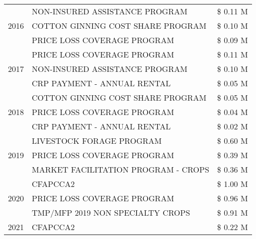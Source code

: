 \begin{tabular}{llr}
\multirow[t]{3}{*}{2016} & NON-INSURED ASSISTANCE PROGRAM & \$ 0.11 M \\
 & COTTON GINNING COST SHARE PROGRAM & \$ 0.10 M \\
 & PRICE LOSS COVERAGE PROGRAM & \$ 0.09 M \\
\cline{1-3}
\multirow[t]{3}{*}{2017} & PRICE LOSS COVERAGE PROGRAM & \$ 0.11 M \\
 & NON-INSURED ASSISTANCE PROGRAM & \$ 0.10 M \\
 & CRP PAYMENT - ANNUAL RENTAL & \$ 0.05 M \\
\cline{1-3}
\multirow[t]{3}{*}{2018} & COTTON GINNING COST SHARE PROGRAM & \$ 0.05 M \\
 & PRICE LOSS COVERAGE PROGRAM & \$ 0.04 M \\
 & CRP PAYMENT - ANNUAL RENTAL & \$ 0.02 M \\
\cline{1-3}
\multirow[t]{3}{*}{2019} & LIVESTOCK FORAGE PROGRAM & \$ 0.60 M \\
 & PRICE LOSS COVERAGE PROGRAM & \$ 0.39 M \\
 & MARKET FACILITATION PROGRAM - CROPS & \$ 0.36 M \\
\cline{1-3}
\multirow[t]{3}{*}{2020} & CFAPCCA2 & \$ 1.00 M \\
 & PRICE LOSS COVERAGE PROGRAM & \$ 0.96 M \\
 & TMP/MFP 2019 NON SPECIALTY CROPS & \$ 0.91 M \\
\cline{1-3}
2021 & CFAPCCA2 & \$ 0.22 M \\
\cline{1-3}
\bottomrule
\end{tabular}

